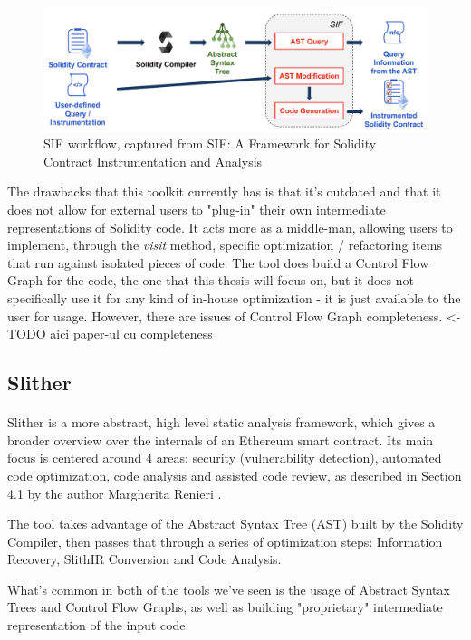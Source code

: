 \begin{figure}
    \centering
    \includegraphics[width=15cm]{images/sif_workflow.png}
    \caption{SIF workflow, captured from SIF: A Framework for Solidity Contract Instrumentation and Analysis \cite{sif}}
    \label{fig:sif-workflow}
\end{figure}

The drawbacks that this toolkit currently has is that it's outdated and that it does not allow for external users to "plug-in" their own intermediate representations of Solidity code. It acts more as a middle-man, allowing users to implement, through the \emph{visit} method, specific optimization / refactoring items that run against isolated pieces of code. The tool does build a Control Flow Graph for the code, the one that this thesis will focus on, but it does not specifically use it for any kind of in-house optimization - it is just available to the user for usage. However, there are issues of Control Flow Graph completeness. <- TODO aici paper-ul cu completeness

\subsection{Slither}
\paragraph*{}
Slither is a more abstract, high level static analysis framework, which gives a broader overview over the internals of an Ethereum smart contract. Its main focus is centered around 4 areas: security (vulnerability detection), automated code optimization, code analysis and assisted code review, as described in Section 4.1 by the author Margherita Renieri \cite{slither}.

The tool takes advantage of the Abstract Syntax Tree (AST) built by the Solidity Compiler, then passes that through a series of optimization steps: Information Recovery, SlithIR Conversion and Code Analysis.

What's common in both of the tools we've seen is the usage of Abstract Syntax Trees and Control Flow Graphs, as well as building "proprietary" intermediate representation of the input code.

